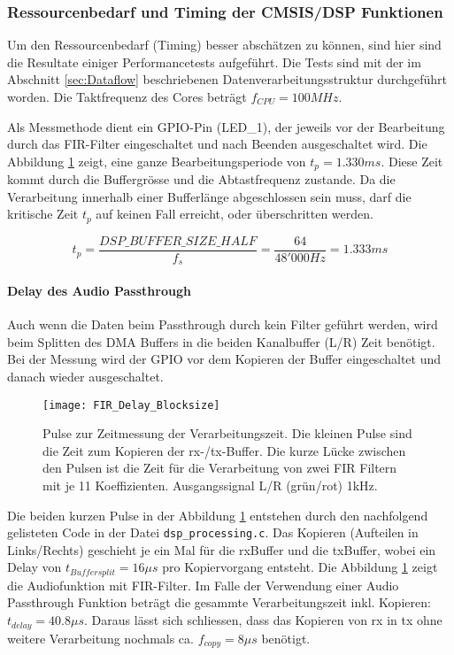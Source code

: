 \subsubsection{Ressourcenbedarf und Timing der CMSIS/DSP Funktionen}
\label{sec:DSP_Timing}


Um den Ressourcenbedarf (Timing) besser abschätzen zu können, sind hier sind die Resultate einiger Performancetests aufgeführt.
Die Tests sind mit der im Abschnitt \ref{sec:Dataflow} beschriebenen Datenverarbeitungsstruktur durchgeführt worden.
Die Taktfrequenz des Cores beträgt $f_{CPU}=100\si{MHz}$.

Als Messmethode dient ein GPIO-Pin (LED\_1), der jeweils vor der Bearbeitung durch das FIR-Filter eingeschaltet und nach Beenden ausgeschaltet wird. 
Die Abbildung \ref{pic:FIR_Delay_Blocksize} zeigt, eine ganze Bearbeitungsperiode von $t_p=1.330\si{ms}$.
Diese Zeit kommt durch die Buffergrösse und die Abtastfrequenz zustande.
Da die Verarbeitung innerhalb einer Bufferlänge abgeschlossen sein muss, darf die 
kritische Zeit $t_p$ auf keinen Fall erreicht, oder überschritten werden.

\begin{equation}
	t_p=\frac{DSP\_BUFFER\_SIZE\_HALF}{f_s}=\frac{64}{48'000\si{Hz}}=1.333\si{ms}
\end{equation}


\paragraph{Delay des Audio Passthrough}

Auch wenn die Daten beim Passthrough durch kein Filter geführt werden, wird beim Splitten des DMA Buffers in die beiden Kanalbuffer (L/R) Zeit benötigt.
Bei der Messung wird der GPIO vor dem Kopieren der Buffer eingeschaltet und danach wieder ausgeschaltet.

\begin{figure}[H]
	\centering
	\texttt{[image: FIR\_Delay\_Blocksize]}
	\caption{Pulse zur Zeitmessung der Verarbeitungszeit. Die kleinen Pulse sind die Zeit zum Kopieren der rx-/tx-Buffer. Die kurze Lücke zwischen den Pulsen ist die Zeit für die Verarbeitung von zwei FIR Filtern mit je 11 Koeffizienten. Ausgangssignal L/R (grün/rot) 1kHz.}
	\label{pic:FIR_Delay_Blocksize}
\end{figure}

Die beiden kurzen Pulse in der Abbildung \ref{pic:FIR_Delay_Blocksize} entstehen durch den nachfolgend gelisteten Code in der Datei \texttt{dsp\_processing.c}.
Das Kopieren (Aufteilen in Links/Rechts) geschieht je ein Mal für die rxBuffer und die txBuffer, wobei ein Delay von $t_{Buffersplit}=16\mu\si{s}$ pro Kopiervorgang entsteht.
Die Abbildung \ref{pic:FIR_Delay_Blocksize} zeigt die Audiofunktion mit FIR-Filter. Im Falle der Verwendung einer Audio Passthrough Funktion beträgt die gesammte Verarbeitungszeit
inkl. Kopieren: $t_{delay}=40.8\mu\si{s}$. Daraus lässt sich schliessen, dass das Kopieren 
von rx in tx ohne weitere Verarbeitung nochmals ca. $f_{copy}=8\mu\si{s}$ benötigt.

